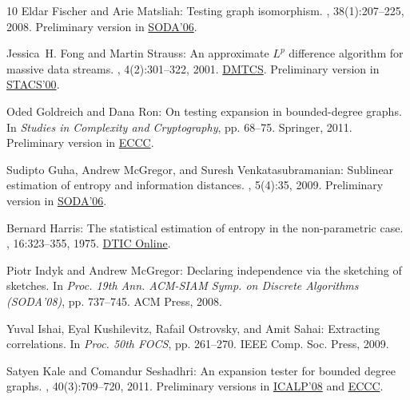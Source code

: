 \begin{thebibliography}{10}
{\sc Eldar Fischer and Arie Matsliah}: Testing graph isomorphism.
, 38(1):207--225, 2008.
\newblock Preliminary version in
  \href{http://dl.acm.org/citation.cfm?id=1109591}{SODA'06}.
\newblock [\epfmtdoi{10.1137/070680795}]

{\sc Jessica~H. Fong and Martin Strauss}: An approximate ${L}^p$ difference
  algorithm for massive data streams.
,
  4(2):301--322, 2001.
\newblock
  \href{http://www.dmtcs.org/dmtcs-ojs/index.php/dmtcs/issue/view/62}{DMTCS}.
  Preliminary version in \href{http://dx.doi.org/
  10.1007/3-540-46541-3_16}{STACS'00}.

{\sc Oded Goldreich and Dana Ron}: On testing expansion in bounded-degree
  graphs.
\newblock In {\em Studies in Complexity and Cryptography}, pp. 68--75.
  Springer, 2011.
\newblock Preliminary version in
  \href{http://eccc.hpi-web.de/report/2000/020/}{ECCC}.
\newblock [\epfmtdoi{10.1007/978-3-642-22670-0\_9}]

{\sc Sudipto Guha, Andrew McGregor, and Suresh Venkatasubramanian}: Sublinear
  estimation of entropy and information distances.
, 5(4):35, 2009.
\newblock Preliminary version in
  \href{http://dx.doi.org/10.1145/1109557.1109637}{SODA'06}.
\newblock [\epfmtdoi{10.1145/1597036.1597038}]

{\sc Bernard Harris}: The statistical estimation of entropy in the
  non-parametric case.
, 16:323--355,
  1975.
\newblock
  \href{http://oai.dtic.mil/oai/oai?verb=getRecord&metadataPrefix=html&identifier=ADA020217}{DTIC
  Online}.

{\sc Piotr Indyk and Andrew McGregor}: Declaring independence via the sketching
  of sketches.
\newblock In {\em Proc. 19th Ann. ACM-SIAM Symp. on Discrete Algorithms
  (SODA'08)}, pp. 737--745. ACM Press, 2008.

{\sc Yuval Ishai, Eyal Kushilevitz, Rafail Ostrovsky, and Amit Sahai}:
  Extracting correlations.
\newblock In {\em Proc. 50th FOCS}, pp. 261--270. IEEE Comp. Soc. Press, 2009.

{\sc Satyen Kale and Comandur Seshadhri}: An expansion tester for bounded
  degree graphs.
, 40(3):709--720, 2011.
\newblock Preliminary versions in
  \href{http://dx.doi.org/10.1007/978-3-540-70575-8_43}{ICALP'08} and
  \href{http://eccc.hpi-web.de/report/2007/076/}{ECCC}.
\newblock [\epfmtdoi{10.1137/100802980}]


\end{thebibliography}
